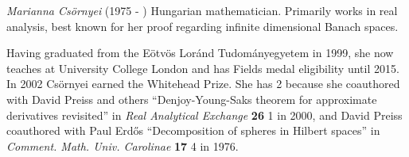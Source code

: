 \documentclass[12pt]{article}
\begin{document}
\emph{Marianna Cs\"ornyei} (1975 - ) Hungarian mathematician. Primarily works in real analysis, best known for her proof regarding infinite dimensional Banach spaces.

Having graduated from the E\"otv\"os Lor\'and Tudom\'anyegyetem in 1999, she now teaches at University College London and has Fields medal eligibility until 2015. In 2002 Cs\"ornyei earned the Whitehead Prize. She has  2 because she coauthored with David Preiss and others ``Denjoy-Young-Saks theorem for approximate derivatives revisited'' in {\it Real Analytical Exchange} {\bf 26} 1 in 2000, and David Preiss coauthored with Paul Erd\H{o}s ``Decomposition of spheres in Hilbert spaces'' in {\it Comment. Math. Univ. Carolinae} {\bf 17} 4 in 1976.
\end{document}
